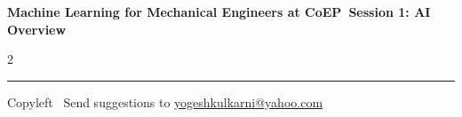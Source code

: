 \documentclass[8pt,landscape]{article}
\begin{document}
\footnotesize

\begin{center}
\Large{\textbf{Machine Learning for Mechanical Engineers at CoEP\ Session 1: AI Overview}}
\end{center}

\begin{multicols}{2}

\end{multicols}

\rule{\linewidth}{0.25pt}
\scriptsize
Copyleft \textcopyleft\  Send suggestions to
\href{http://www.yogeshkulkarni.com}{yogeshkulkarni@yahoo.com}
\end{document}
